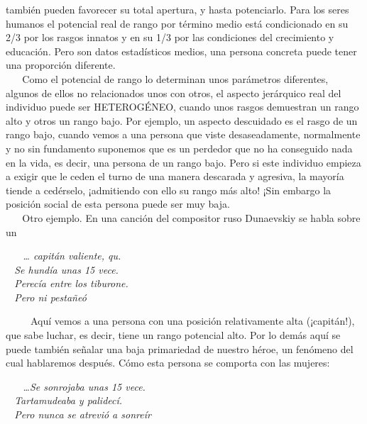 también pueden favorecer su total apertura, y hasta potenciarlo. Para
los seres humanos el potencial real de rango por término medio está
condicionado en su 2/3 por los rasgos innatos y en su 1/3 por las
condiciones del crecimiento y educación. Pero son datos estadísticos
medios, una persona concreta puede tener una proporción diferente.\\
\hspace*{0.333em} ~ ~ Como el potencial de rango lo determinan unos
parámetros diferentes, algunos de ellos no relacionados unos con otros,
el aspecto jerárquico real del individuo puede ser HETEROGÉNEO, cuando
unos rasgos demuestran un rango alto y otros un rango bajo. Por ejemplo,
un aspecto descuidado es el rasgo de un rango bajo, cuando vemos a una
persona que viste desaseadamente, normalmente y no sin fundamento
suponemos que es un perdedor que no ha conseguido nada en la vida, es
decir, una persona de un rango bajo. Pero si este individuo empieza a
exigir que le ceden el turno de una manera descarada y agresiva, la
mayoría tiende a cedérselo, ¡admitiendo con ello su rango más alto! ¡Sin
embargo la posición social de esta persona puede ser muy baja.\\
\hspace*{0.333em} ~ ~ Otro ejemplo. En una canción del compositor ruso
Dunaevskiy se habla sobre un

\noindent
\emph{~ ~ \ldots{} capitán valiente, qu.\\
\hspace*{0.333em} ~ Se hundía unas 15 vece.\\
\hspace*{0.333em} ~ Perecía entre los tiburone.\\
\hspace*{0.333em} ~ Pero ni pestañeó}

~ ~ ~ Aquí vemos a una persona con una posición relativamente alta
(¡capitán!), que sabe luchar, es decir, tiene un rango potencial alto.
Por lo demás aquí se puede también señalar una baja primariedad de
nuestro héroe, un fenómeno del cual hablaremos después. Cómo esta
persona se comporta con las mujeres:

\noindent
\emph{~ ~ \ldots{}Se sonrojaba unas 15 vece.\\
\hspace*{0.333em} ~ Tartamudeaba y palidecí.\\
\hspace*{0.333em} ~ Pero nunca se atrevió a sonreír}

